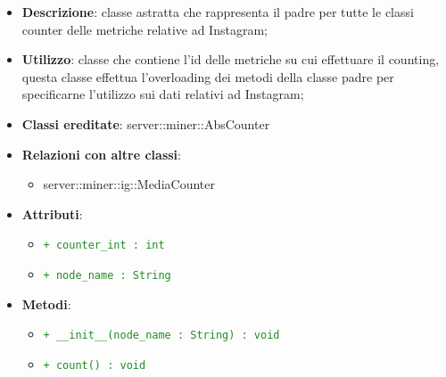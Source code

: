 			\begin{itemize}
				\item \textbf{Descrizione}: classe astratta che rappresenta il padre per tutte le classi counter delle metriche relative ad Instagram;
				\item \textbf{Utilizzo}: classe che contiene l’id delle metriche su cui effettuare il counting, questa classe effettua l'overloading dei metodi della classe padre per specificarne l’utilizzo sui dati relativi ad Instagram;
				\item \textbf{Classi ereditate}: server::miner::AbsCounter
				\item \textbf{Relazioni con altre classi}:
					\begin{itemize}
						\item server::miner::ig::MediaCounter
					\end{itemize}
				\item \textbf{Attributi}:
					\begin{itemize}
						\item \textcolor{forestgreen}{\texttt{+ counter\_int : int}}
						\item \textcolor{forestgreen}{\texttt{+ node\_name : String}}
					\end{itemize}
				\item \textbf{Metodi}: 
					\begin{itemize}
						\item \textcolor{forestgreen}{\texttt{+ \_\_init\_\_(node\_name : String) : void}}
						\item \textcolor{forestgreen}{\texttt{+ count() : void}}
						\begin{description}

\end{description}
\end{itemize}
\end{itemize}

